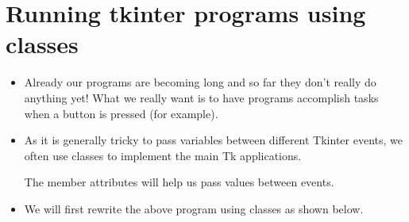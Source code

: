 \documentclass[letterpaper,10pt,english]{sphinxmanual}
\begin{document}
\section{Running tkinter programs using classes}
\label{\detokenize{lecture_notes/lec22_tkinter:running-tkinter-programs-using-classes}}\begin{itemize}
\item {} 
Already our programs are becoming long and so far they don’t really
do anything yet!  What we really want is to have programs
accomplish tasks when a button is pressed (for example).

\item {} 
As it is generally tricky to pass variables between different
Tkinter events, we often use classes to implement the main Tk
applications.

The member attributes will help us pass values between
events.

\item {} 
We will first rewrite the above program using classes as shown
below.

%
\begin{sphinxVerbatim}[commandchars=\\\{\}]
   

 
      
          

          
          


\end{sphinxVerbatim}
\end{itemize}
\end{document}
